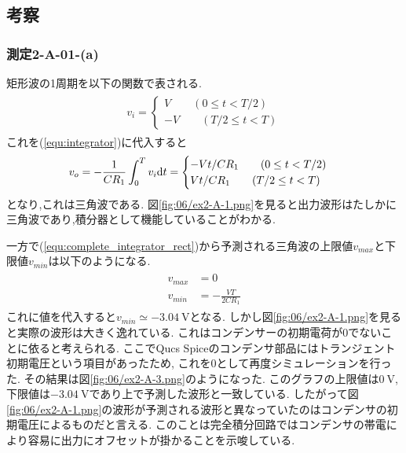 \subsection{考察}
\subsubsection{測定2-A-01-(a)}
矩形波の1周期を以下の関数で表される.
\begin{align}
  \begin{split}
    v_i=
    \begin{cases}
      V\qquad(0\leq t<T/2)\\
      -V\qquad(T/2\leq t<T)
    \end{cases}
  \end{split}
\end{align}
これを(\ref{equ:integrator})に代入すると
\begin{align}
  \label{equ:complete_integrator_rect}
  \begin{split}
    v_o=-\frac{1}{CR_1}\int_0^Tv_i{\rm d}t
    =
    \begin{cases}
      -Vt/CR_1\qquad(0\leq t<T/2)\\
      Vt/CR_1\qquad(T/2\leq t<T)
    \end{cases}
  \end{split}
\end{align}
となり,これは三角波である.
図\ref{fig:06/ex2-A-1.png}を見ると出力波形はたしかに三角波であり,積分器として機能していることがわかる.

一方で(\ref{equ:complete_integrator_rect})から予測される三角波の上限値$v_{max}$と下限値$v_{min}$は以下のようになる.
\begin{align}
  \begin{split}
    v_{max}&=0\\
    v_{min}&=-\frac{VT}{2CR_1}
  \end{split}
\end{align}
これに値を代入すると$v_{min}\simeq-3.04\ \si{\volt}$となる.
しかし図\ref{fig:06/ex2-A-1.png}を見ると実際の波形は大きく逸れている.
これはコンデンサーの初期電荷が$0$でないことに依ると考えられる.
ここでQucs Spiceのコンデンサ部品にはトランジェント初期電圧という項目があったため,
これを0として再度シミュレーションを行った.
その結果は図\ref{fig:06/ex2-A-3.png}のようになった.
このグラフの上限値は$0\ \si{\volt}$,下限値は$-3.04\ \si{\volt}$であり上で予測した波形と一致している.
したがって図\ref{fig:06/ex2-A-1.png}の波形が予測される波形と異なっていたのはコンデンサの初期電圧によるものだと言える.
このことは完全積分回路ではコンデンサの帯電により容易に出力にオフセットが掛かることを示唆している.
